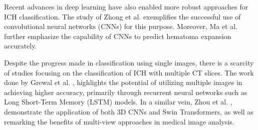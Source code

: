 Recent advances in deep learning have also enabled more robust approaches for ICH classification. The study of Zhong et al. \cite{Zhong2021} exemplifies the successful use of convolutional neural networks (CNNs) for this purpose. Moreover, Ma et al. \cite{Ma2022} further emphasize the capability of CNNs to predict hematoma expansion accurately.


Despite the progress made in classification using single images, there is a scarcity of studies focusing on the classification of ICH with multiple CT slices. The work done by Grewal et al. \cite{8363574}, highlights the potential of utilizing multiple images in achieving higher accuracy, primarily through recurrent neural networks such as Long Short-Term Memory (LSTM) models. In a similar vein, Zhou et al. \cite{Zhou2024}, demonstrate the application of both 3D CNNs and Swin Transformers, as well as remarking the benefits of multi-view approaches in medical image analysis.

